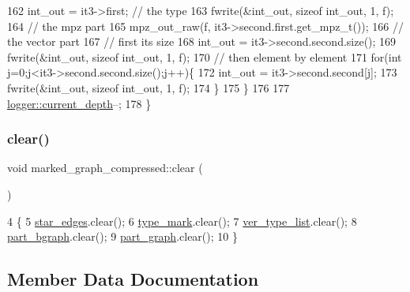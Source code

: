 \begin{DoxyCode}
162     int\_out = it3->first; \textcolor{comment}{// the type}
163     fwrite(&int\_out, \textcolor{keyword}{sizeof} int\_out, 1, f);
164     \textcolor{comment}{// the mpz part}
165     mpz\_out\_raw(f, it3->second.first.get\_mpz\_t());
166     \textcolor{comment}{// the vector part}
167     \textcolor{comment}{// first its size}
168     int\_out = it3->second.second.size();
169     fwrite(&int\_out, \textcolor{keyword}{sizeof} int\_out, 1, f);
170     \textcolor{comment}{// then element by element}
171     \textcolor{keywordflow}{for}(\textcolor{keywordtype}{int} j=0;j<it3->second.second.size();j++)\{
172       int\_out = it3->second.second[j];
173       fwrite(&int\_out, \textcolor{keyword}{sizeof} int\_out, 1, f);
174     \}
175   \}
176 
177   \hyperlink{classlogger_a9d29b49bd318a719a8e85b59eac54fe0}{logger::current\_depth}--;
178 \}
\end{DoxyCode}
\mbox{\label{classmarked__graph__compressed_af58307bfadcaa4c3ca6dd594c2f9b3a9}} 
\subsubsection{\texorpdfstring{clear()}{clear()}}
{\footnotesize\ttfamily void marked\+\_\+graph\+\_\+compressed\+::clear (\begin{DoxyParamCaption}{ }\end{DoxyParamCaption})}


\begin{DoxyCode}
4 \{
5   \hyperlink{classmarked__graph__compressed_a7df5779d313486644132bd816937f532}{star\_edges}.clear();
6   \hyperlink{classmarked__graph__compressed_a86b00223525703e973415cbc9c94da68}{type\_mark}.clear();
7   \hyperlink{classmarked__graph__compressed_af2e3e55223d436628a02758dfae88493}{ver\_type\_list}.clear();
8   \hyperlink{classmarked__graph__compressed_a7b3267063fba30b45eb21b3ba4e07536}{part\_bgraph}.clear();
9   \hyperlink{classmarked__graph__compressed_ae179a4737e6eab905c18a94d44ef64b7}{part\_graph}.clear();
10 \}
\end{DoxyCode}


\subsection{Member Data Documentation}
\mbox{\label{classmarked__graph__compressed_a8b2aaac68e9332ddc78d88eb60b323a7}} 

